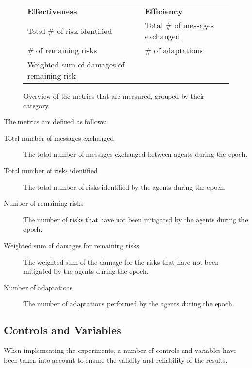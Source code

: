 \begin{figure}[H]
    \centering
    \begin{tabular}{l|l}
        \textbf{Effectiveness}            & \textbf{Efficiency}            \\
        Total \# of risk identified       & Total \# of messages exchanged \\
        \# of remaining risks             & \# of adaptations              \\
        Weighted sum of damages of remaining risk &                               
    \end{tabular}
    \caption{\label{fig:metrics-groups}Overview of the metrics that are measured, grouped by their category.}
\end{figure}


The metrics are defined as follows:

\begin{description}
    \item[Total number of messages exchanged] The total number of messages exchanged between agents during the epoch.
    \item[Total number of risks identified] The total number of risks identified by the agents during the epoch.
    \item[Number of remaining risks] The number of risks that have not been mitigated by the agents during the epoch.
    \item[Weighted sum of damages for remaining risks] The weighted sum of the damage for the risks that have not been mitigated by the agents during the epoch.
    \item[Number of adaptations] The number of adaptations performed by the agents during the epoch.
\end{description}

\subsection{Controls and Variables}
\label{ssec:controls-variables}

When implementing the experiments, a number of controls and variables have been taken into account to ensure the validity and reliability of the results.

